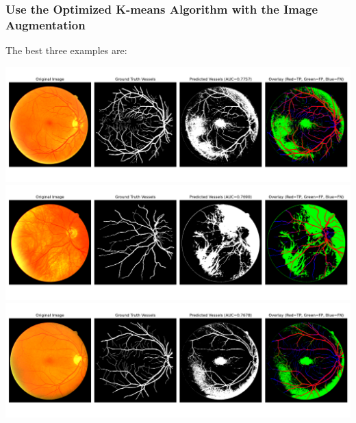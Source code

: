 \documentclass[12pt,letterpaper]{article}
\begin{document}
\subsubsection{Use the Optimized K-means Algorithm with the Image Augmentation}
The best three examples are:
\begin{center}
    \includegraphics[scale=0.35]{Figures/4 Optmized 1st.png}
    \includegraphics[scale=0.35]{Figures/4 Optmized 2nd.png}
    \includegraphics[scale=0.35]{Figures/4 Optmized 3rd.png}
\end{center}
\end{document}
